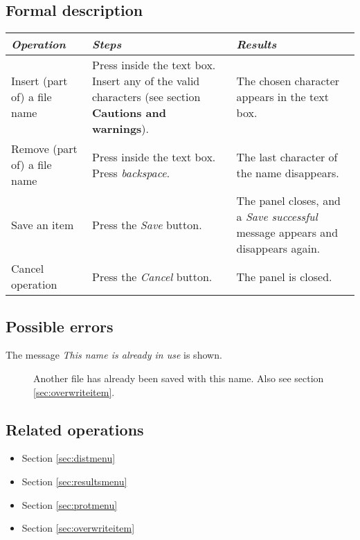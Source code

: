   \subsection*{Formal description}
    \begin{tabularx}{\textwidth}{XXX}
    \toprule
    \emph{Operation} & \emph{Steps} & \emph{Results} \\
    \midrule
    Insert (part of) a file name & Press inside the text box. Insert any of the valid characters (see section \textbf{Cautions and warnings}). & The chosen character appears in the text box. \\
    \midrule
    Remove (part of) a file name & Press inside the text box. Press \emph{backspace}. & The last character of the name disappears. \\
    \midrule
    Save an item & Press the \emph{Save} button. & The panel closes, and a \emph{Save successful} message appears and disappears again. \\
    \midrule
    Cancel operation & Press the \emph{Cancel} button. & The panel is closed. \\
    \bottomrule
\end{tabularx}

  \subsection*{Possible errors}
  \begin{description}
  \item[The message \emph{This name is already in use} is shown.] Another file has already been saved with this name. Also see section \ref{sec:overwriteitem}.
  \end{description}

  \subsection*{Related operations}
   \begin{itemize}
   \item Section \ref{sec:distmenu}
   \item Section \ref{sec:resultsmenu}
   \item Section \ref{sec:protmenu}
   \item Section \ref{sec:overwriteitem}
  \end{itemize}

